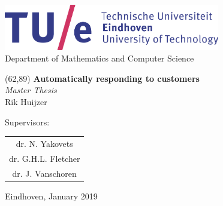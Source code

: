 \documentclass[a4paper,10pt,twoside]{report}
\author{\me}
\newcommand{\doctitle}{Automatically responding to customers}
\newcommand{\docsubtitle}{Master Thesis}
\newcommand{\me}{Rik Huijzer}
\newcommand{\version}{} %
\newcommand{\monthYear}{January 2019}
\newcommand{\firstCommitteeMember}{dr. N. Yakovets}
\newcommand{\secondCommitteeMember}{dr. G.H.L. Fletcher}
\newcommand{\thirdCommitteeMember}{dr. J. Vanschoren}
\begin{document}
    \begin{center}
        \includegraphics[height=2cm]{figures/tue-logo-high.png}\\
        \large
        Department of Mathematics and Computer Science

        \vspace*{10cm}

        \setlength{\TPHorizModule}{1mm}
        \setlength{\TPVertModule}{\TPHorizModule}
        \newlength{\backupparindent}
        \setlength{\backupparindent}{\parindent}
        \setlength{\parindent}{0mm}
        \begin{textblock}{95}
            (62,89)
            \vspace*{1mm}
            \huge
            \textbf{\doctitle \\}
            \Large
            \vspace*{5mm}
            \textit{\docsubtitle}\\
            \vspace*{10mm}
            \Large
            \me\\
        \end{textblock}

        \large
        Supervisors:\\
        \begin{tabular}{c}
            \firstCommitteeMember\\
            \secondCommitteeMember\\
            \thirdCommitteeMember\\
        \end{tabular}

        \vfill
        \version

        \vfill
        \large
        Eindhoven, \monthYear\\

        \setlength{\parindent}{\backupparindent}
    \end{center}
\end{document}
